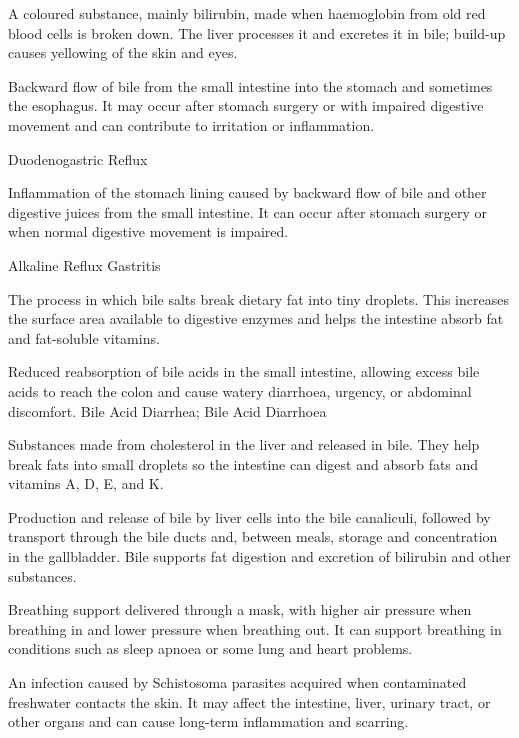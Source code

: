  A coloured substance, mainly bilirubin, made when haemoglobin from old red blood cells is broken down. The liver processes it and excretes it in bile; build-up causes yellowing of the skin and eyes.

 Backward flow of bile from the small intestine into the stomach and sometimes the esophagus. It may occur after stomach surgery or with impaired digestive movement and can contribute to irritation or inflammation.

\synonyms
Duodenogastric Reflux

 Inflammation of the stomach lining caused by
backward flow of bile and other digestive juices from the small intestine.
It can occur after stomach surgery or when normal digestive movement is
impaired.

\synonyms
Alkaline Reflux Gastritis

 The process in which bile salts break dietary fat into tiny droplets. This increases the surface area available to digestive enzymes and helps the intestine absorb fat and fat-soluble vitamins.

 Reduced reabsorption of bile acids in the small intestine, allowing excess bile acids to reach the colon and cause watery diarrhoea, urgency, or abdominal discomfort.
\synonyms
Bile Acid Diarrhea; Bile Acid Diarrhoea

 Substances made from cholesterol in the liver and released in bile. They help break fats into small droplets so the intestine can digest and absorb fats and vitamins A, D, E, and K.

 Production and release of bile by liver cells into the bile canaliculi, followed by transport through the bile ducts and, between meals, storage and concentration in the gallbladder. Bile supports fat digestion and excretion of bilirubin and other substances.

 Breathing support delivered
through a mask, with higher air pressure when breathing in and lower pressure
when breathing out. It can support breathing in conditions such as sleep
apnoea or some lung and heart problems.

 An infection caused by Schistosoma parasites acquired when contaminated freshwater contacts the skin. It may affect the intestine, liver, urinary tract, or other organs and can cause long-term inflammation and scarring.

